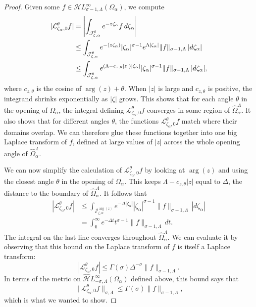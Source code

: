 \documentclass{article}
\let\Re\relax
\DeclareMathOperator{\Re}{Re}
\newcommand{\singexp}[2]{\mathcal{H}L^\infty_{#1, #2}}
\newcommand{\dualsingexp}[2]{\widehat{\mathcal{H}}L^\infty_{#1, #2}}
\newcommand{\laplace}{\mathcal{L}}
\theoremstyle{definition}
\theoremstyle{plain}
\begin{document}
\begin{proof}
Given some $f \in \singexp{\sigma-1}{\Lambda}(\Omega_\alpha)$, we compute
\begin{align*}
|\laplace_{\zeta_\alpha, 0}^\theta f| & = \left| \int_{\mathcal{J}_{\zeta, \alpha}^\theta} e^{-z\zeta_\alpha} f\,d\zeta_\alpha \right| \\
& \le \int_{\mathcal{J}_{\zeta, \alpha}^\theta} e^{-\Re(z\zeta_\alpha)} |\zeta_\alpha|^{\sigma-1} e^{\Lambda |\zeta_\alpha|} \|f\|_{\sigma-1, \Lambda}\,|d\zeta_\alpha| \\
& \le \int_{\mathcal{J}_{\zeta, \alpha}^\theta} e^{(\Lambda - c_{z, \theta}|z|)|\zeta_\alpha|} |\zeta_\alpha|^{\sigma-1} \|f\|_{\sigma-1, \Lambda}\,|d\zeta_\alpha|,
\end{align*}
where $c_{z, \theta}$ is the cosine of $\arg(z) + \theta$. When $|z|$ is large and $c_{z, \theta}$ is positive, the integrand shrinks exponentially as $|\zeta|$ grows. This shows that for each angle $\theta$ in the opening of $\Omega_\alpha$, the integral defining $\laplace_{\zeta_\alpha, 0}^\theta f$ converges in some region of $\widehat{\Omega}_\alpha^\Lambda$. It also shows that for different angles $\theta$, the functions $\laplace_{\zeta_\alpha, 0}^\theta f$ match where their domains overlap. We can therefore glue these functions together into one big Laplace transform of $f$, defined at large values of $|z|$ across the whole opening angle of $\widehat{\Omega}_\alpha^\Lambda$.

We can now simplify the calculation of $\laplace_{\zeta_\alpha, 0}^\theta f$ by looking at $\arg(z)$ and using the closest angle $\theta$ in the opening of $\Omega_\alpha$. This keeps $\Lambda - c_{z, \theta}|z|$ equal to $\Delta$, the distance to the boundary of $\widehat{\Omega}_\alpha^\Lambda$. It follows that
\begin{align*}
|\laplace_{\zeta_\alpha, 0}^\theta f| & \le \int_{\mathcal{J}_{\zeta, \alpha}^{\arg(z)}} e^{-\Delta|\zeta_\alpha|} |\zeta_\alpha|^{\sigma-1} \|f\|_{\sigma-1, \Lambda}\,|d\zeta_\alpha| \\
& = \int_0^\infty e^{-\Delta t} t^{\sigma-1} \|f\|_{\sigma-1, \Lambda}\,dt.
\end{align*}
The integral on the last line converges throughout $\widehat{\Omega}_\alpha^\Lambda$. We can evaluate it by observing that this bound on the Laplace transform of $f$ is itself a Laplace transform:
\[ |\laplace_{\zeta_\alpha, 0}^\theta f| \le \Gamma(\sigma) \Delta^{-\sigma} \|f\|_{\sigma-1, \Lambda}. \]
In terms of the metric on $\dualsingexp{-\sigma}{\Lambda}(\Omega_\alpha)$ defined above, this bound says that
\[ \|\laplace_{\zeta_\alpha, 0}^\theta f\|_{\sigma, \Lambda} \le \Gamma(\sigma) \|f\|_{\sigma-1, \Lambda}, \]
which is what we wanted to show.
\end{proof}
\end{document}
